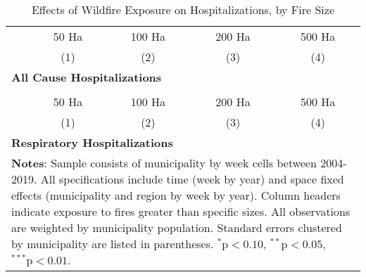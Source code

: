 \documentclass[11pt]{article}
\begin{document}
\begin{spacing}{1.3}
\begin{table}[htpb!]
    \caption{Effects of Wildfire Exposure on Hospitalizations, by Fire Size}
    \label{tab:RFhospAge}
    \centering
    \begin{tabular}{lcccc} \\ \toprule
    & 50 Ha & 100 Ha & 200 Ha & 500 Ha \\ 
    & (1) & (2) & (3) & (4) \\ \midrule
    \multicolumn{5}{l}{\textbf{All Cause Hospitalizations}}\\
     
    \midrule \\
      & 50 Ha & 100 Ha & 200 Ha & 500 Ha \\ 
    & (1) & (2) & (3) & (4)\\ \midrule
    \multicolumn{5}{l}{\textbf{Respiratory Hospitalizations}}\\
     
    \bottomrule
    \multicolumn{5}{p{11.6cm}}{{\footnotesize \textbf{Notes}: Sample consists of municipality by week cells between 2004-2019.  All specifications include time (week by year) and space fixed effects (municipality and region by week by year).  Column headers indicate exposure to fires greater than specific sizes.  All observations are weighted by municipality population.  Standard errors clustered by municipality are listed in parentheses.   $^{*}\text{p}<0.10$, $^{**}\text{p}<0.05$, $^{***}\text{p}<0.01$.}}
    \end{tabular}
\end{table}




\end{spacing}
\end{document}
